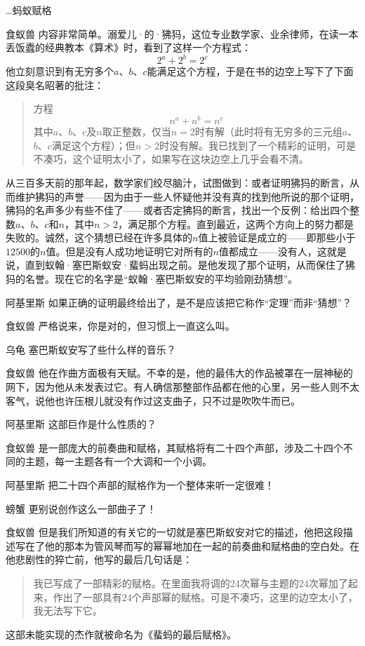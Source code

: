 \begin{dialog}{…蚂蚁赋格}
\begin{dialogue}
\item[食蚁兽]内容非常简单。溺爱儿·的·狒犸，这位专业数学家、业余律师，在读一本丢饭蠹的经典教本《算术》时，看到了这样一个方程式：
\[
  2^a+2^b=2^c
\]
他立刻意识到有无穷多个$a$、$b$、$c$能满足这个方程，于是在书的边空上写下了下面这段臭名昭著的批注：
\begin{quote}
方程
\[
  n^a+n^b=n^c
\]
其中$a$、$b$、$c$及$n$取正整数，仅当$n=2$时有解（此时将有无穷多的三元组$a$、$b$、$c$满足这个方程）；但$n>2$时没有解。我已找到了一个精彩的证明，可是不凑巧，这个证明太小了，如果写在这块边空上几乎会看不清。
\end{quote}
从三百多天前的那年起，数学家们绞尽脑汁，试图做到：或者证明狒犸的断言，从而维护狒犸的声誉——因为由于一些人怀疑他并没有真的找到他所说的那个证明，狒犸的名声多少有些不佳了——或者否定狒犸的断言，找出一个反例：给出四个整数$a$、$b$、$c$和$n$，其中$n>2$，满足那个方程。直到最近，这两个方向上的努力都是失败的。诚然，这个猜想已经在许多具体的$n$值上被验证是成立的——即那些小于$12500$的$n$值。但是没有人成功地证明它对所有的$n$值都成立——没有人，这就是说，直到蚁翰·塞巴斯蚁安·蜚蚂出现之前。是他发现了那个证明，从而保住了狒犸的名誉。现在它的名字是“蚁翰·塞巴斯蚁安的平均验刚劲猜想”。

\item[阿基里斯]如果正确的证明最终给出了，是不是应该把它称作“定理”而非“猜想”？

\item[食蚁兽]严格说来，你是对的，但习惯上一直这么叫。

\item[乌龟]塞巴斯蚁安写了些什么样的音乐？

\item[食蚁兽]他在作曲方面极有天赋。不幸的是，他的最伟大的作品被罩在一层神秘的网下，因为他从未发表过它。有人确信那整部作品都在他的心里，另一些人则不太客气，说他也许压根儿就没有作过这支曲子，只不过是吹吹牛而已。

\item[阿基里斯]这部巨作是什么性质的？

\item[食蚁兽]是一部庞大的前奏曲和赋格，其赋格将有二十四个声部，涉及二十四个不同的主题，每一主题各有一个大调和一个小调。

\item[阿基里斯]把二十四个声部的赋格作为一个整体来听一定很难！

\item[螃蟹]更别说创作这么一部曲子了！

\item[食蚁兽]但是我们所知道的有关它的一切就是塞巴斯蚁安对它的描述，他把这段描述写在了他的那本为管风琴而写的幂幂地加在一起的前奏曲和赋格曲的空白处。在他悲剧性的猝亡前，他写的最后几句话是：
\begin{quote}
我已写成了一部精彩的赋格。在里面我将调的$24$次幂与主题的$24$次幂加了起来，作出了一部具有$24$个声部幂的赋格。可是不凑巧，这里的边空太小了，我无法写下它。
\end{quote}
这部未能实现的杰作就被命名为《蜚蚂的最后赋格》。


\end{dialogue}
\end{dialog}
